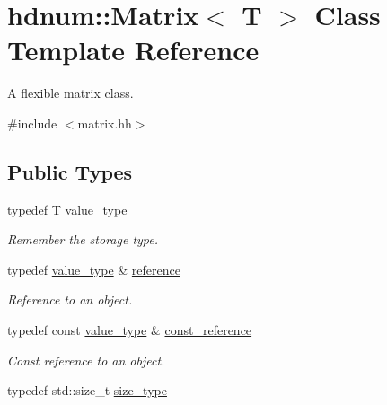 \hypertarget{classhdnum_1_1Matrix}{
\section{hdnum::Matrix$<$ T $>$ Class Template Reference}
\label{classhdnum_1_1Matrix}
}


A flexible matrix class.  




{\ttfamily \#include $<$matrix.hh$>$}

\subsection*{Public Types}
\begin{DoxyCompactItemize}
\item 
\hypertarget{classhdnum_1_1Matrix_a6ebaff96f20f8e78a454ffabdd7723f6}{
typedef T \hyperlink{classhdnum_1_1Matrix_a6ebaff96f20f8e78a454ffabdd7723f6}{value\_\-type}}
\label{classhdnum_1_1Matrix_a6ebaff96f20f8e78a454ffabdd7723f6}

\begin{DoxyCompactList}\small\item\em Remember the storage type. \item\end{DoxyCompactList}\item 
\hypertarget{classhdnum_1_1Matrix_ad41eb9538a08f24849a7b68b4732e0bf}{
typedef \hyperlink{classhdnum_1_1Matrix_a6ebaff96f20f8e78a454ffabdd7723f6}{value\_\-type} \& \hyperlink{classhdnum_1_1Matrix_ad41eb9538a08f24849a7b68b4732e0bf}{reference}}
\label{classhdnum_1_1Matrix_ad41eb9538a08f24849a7b68b4732e0bf}

\begin{DoxyCompactList}\small\item\em Reference to an object. \item\end{DoxyCompactList}\item 
\hypertarget{classhdnum_1_1Matrix_a20309dda0b0e95081958c7d3235e2c20}{
typedef const \hyperlink{classhdnum_1_1Matrix_a6ebaff96f20f8e78a454ffabdd7723f6}{value\_\-type} \& \hyperlink{classhdnum_1_1Matrix_a20309dda0b0e95081958c7d3235e2c20}{const\_\-reference}}
\label{classhdnum_1_1Matrix_a20309dda0b0e95081958c7d3235e2c20}

\begin{DoxyCompactList}\small\item\em Const reference to an object. \item\end{DoxyCompactList}\item 
\hypertarget{classhdnum_1_1Matrix_adeafaf5fa5732e0d67f90ffa2119fbf1}{
typedef std::size\_\-t \hyperlink{classhdnum_1_1Matrix_adeafaf5fa5732e0d67f90ffa2119fbf1}{size\_\-type}}
\label{classhdnum_1_1Matrix_adeafaf5fa5732e0d67f90ffa2119fbf1}


\end{DoxyCompactItemize}

